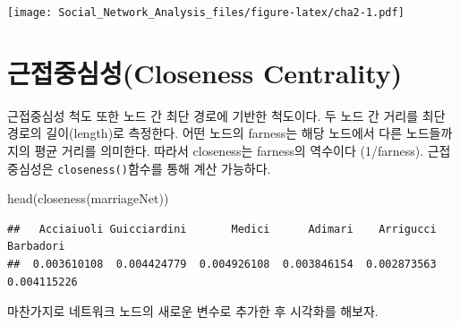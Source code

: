 \documentclass[
]{book}
\newenvironment{Shaded}{\begin{snugshade}}{\end{snugshade}}
\newcommand{\AttributeTok}[1]{\textcolor[rgb]{0.77,0.63,0.00}{#1}}
\newcommand{\DecValTok}[1]{\textcolor[rgb]{0.00,0.00,0.81}{#1}}
\newcommand{\FunctionTok}[1]{\textcolor[rgb]{0.00,0.00,0.00}{#1}}
\newcommand{\NormalTok}[1]{#1}
\newcommand{\OtherTok}[1]{\textcolor[rgb]{0.56,0.35,0.01}{#1}}
\newcommand{\SpecialCharTok}[1]{\textcolor[rgb]{0.00,0.00,0.00}{#1}}
\newcommand{\StringTok}[1]{\textcolor[rgb]{0.31,0.60,0.02}{#1}}
\begin{document}
\texttt{[image: Social\_Network\_Analysis\_files/figure-latex/cha2-1.pdf]}

\hypertarget{uxadfcuxc811uxc911uxc2ecuxc131closeness-centrality}{%
\section{근접중심성(Closeness Centrality)}\label{uxadfcuxc811uxc911uxc2ecuxc131closeness-centrality}}

근접중심성 척도 또한 노드 간 최단 경로에 기반한 척도이다. 두 노드 간 거리를 최단 경로의 길이(length)로 측정한다. 어떤 노드의 farness는 해당 노드에서 다른 노드들까지의 평균 거리를 의미한다. 따라서 closeness는 farness의 역수이다 (1/farness). 근접중심성은 \texttt{closeness()}함수를 통해 계산 가능하다.

\begin{Shaded}
\begin{Highlighting}[]
\FunctionTok{head}\NormalTok{(}\FunctionTok{closeness}\NormalTok{(marriageNet))}
\end{Highlighting}
\end{Shaded}

\begin{verbatim}
##   Acciaiuoli Guicciardini       Medici      Adimari    Arrigucci    Barbadori 
##  0.003610108  0.004424779  0.004926108  0.003846154  0.002873563  0.004115226
\end{verbatim}

마찬가지로 네트워크 노드의 새로운 변수로 추가한 후 시각화를 해보자.

\begin{Shaded}
\end{Shaded}

\begin{Shaded}
\end{Shaded}
\end{document}
